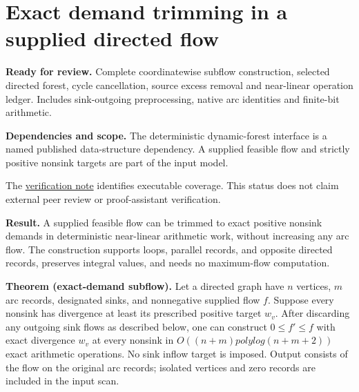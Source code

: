 
\hypertarget{af-32c0fc642d-exact-demand-trimming-in-a-supplied-directed-flow}{%
\section{Exact demand trimming in a supplied directed flow}\label{af-32c0fc642d-exact-demand-trimming-in-a-supplied-directed-flow}}

\textbf{Ready for review.} Complete coordinatewise subflow construction, selected directed forest, cycle cancellation, source excess removal and near-linear operation ledger. Includes sink-outgoing preprocessing, native arc identities and finite-bit arithmetic.

\textbf{Dependencies and scope.} The deterministic dynamic-forest interface is a named published data-structure dependency. A supplied feasible flow and strictly positive nonsink targets are part of the input model.

The \href{https://github.com/icekylinx/algorithm-frontier/blob/main/manuscripts/graph-backends/verify/README.md}{verification note} identifies executable coverage. This status does not claim external peer review or proof-assistant verification.

\textbf{Result.} A supplied feasible flow can be trimmed to exact positive nonsink demands in deterministic near-linear arithmetic work, without increasing any arc flow. The construction supports loops, parallel records, and opposite directed records, preserves integral values, and needs no maximum-flow computation.

\textbf{Theorem (exact-demand subflow).} Let a directed graph have \(n\) vertices, \(m\) arc records, designated sinks, and nonnegative supplied flow \(f\). Suppose every nonsink has divergence at least its prescribed positive target \(w_v\). After discarding any outgoing sink flows as described below, one can construct \(0 ≤ f′ ≤ f\) with exact divergence \(w_v\) at every nonsink in \(O((n+m) polylog(n+m+2))\) exact arithmetic operations. No sink inflow target is imposed. Output consists of the flow on the original arc records; isolated vertices and zero records are included in the input scan.

